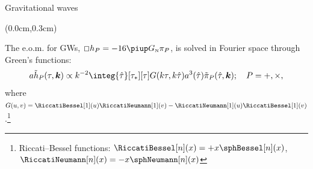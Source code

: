 \begin{frame}{Gravitational waves}
    
    \begin{textblock*}{\paperwidth-0.3cm}(0.0cm,0.3cm)
        \begin{flushright}
            \ifOnlyNotes\else
            \fi
        \end{flushright}
    \end{textblock*}

    The e.o.m. for GWs, \(\sq h_P = - 16 \piGN\pi_P\), %
    is solved in Fourier space through Green's functions:
    \begin{equation}
        a\tilde{h}_P(\tau, \vec{k}) \propto k^{-2} \integ{\hat{\tau}}[\tau_\ast][\tau] G(k\tau, k\hat{\tau}) a^3(\hat{\tau}) \tilde{\pi}_P  %
        (\hat{\tau}, \vec{k}); \quad P=+,\times,
    \end{equation}
    where $G(u,v) = \RiccatiBessel[1](u)\RiccatiNeumann[1](v)-\RiccatiNeumann[1](u)\RiccatiBessel[1](v)$.\footnote<1>[5]{Riccati--Bessel functions: \( \RiccatiBessel[n](x) =+  x\sphBessel[n](x) \), \( \RiccatiNeumann[n](x) =- x\sphNeumann[n](x) \)} %
    \par
    \medskip
    {\small{}}


\begin{notes}[1][GWs]
\end{notes}
\end{frame}


